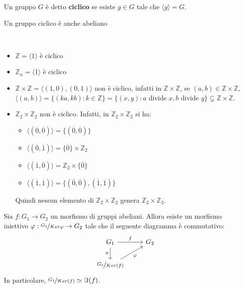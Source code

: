 \documentclass[../main.tex]{subfiles}
\begin{document}
\begin{definition}
    Un gruppo $G$ è detto \textbf{ciclico} se esiste $g \in G$ tale che $\langle g \rangle = G$.

    Un gruppo ciclico è anche abeliano
\end{definition}

\begin{example}
    \
    \begin{itemize}
        \item $\mathbb{Z} = \langle 1 \rangle$ è ciclico
        \item $\mathbb{Z}_n = \langle \overline{1} \rangle$ è ciclico
        \item $\mathbb{Z} \times \mathbb{Z} = \langle (1,0), (0,1) \rangle$ non è ciclico,
              infatti in $\mathbb{Z}  \times \mathbb{Z} $, se $(a,b) \in \mathbb{Z} \times \mathbb{Z} $,
              $\langle (a,b) \rangle = \{(ka,kb) : k \in \mathbb{Z} \} = \{(x,y) : a \text{ divide } x,b \text{ divide } y\}
                  \subsetneq \mathbb{Z} \times \mathbb{Z} $.
        \item $\mathbb{Z}_2 \times \mathbb{Z}_2$ non è ciclico. Infatti, in $\mathbb{Z}_2 \times \mathbb{Z}_2$ si ha:
              \
              \begin{itemize}
                  \item $\langle (\overline{0},\overline{0}) \rangle = \{(\overline{0},\overline{0})\}$
                  \item $\langle (\overline{0}, \overline{1}) \rangle = \{\overline{0}\} \times \mathbb{Z}_2$
                  \item  $\langle (\overline{1}, \overline{0}) \rangle = \mathbb{Z}_2 \times \{\overline{0}\}$
                  \item $\langle (\overline{1}, \overline{1}) \rangle = \{(\overline{0},\overline{0}),(\overline{1},\overline{1})\}$
              \end{itemize}
              Quindi nessun elemento di $\mathbb{Z}_2 \times \mathbb{Z}_2$ genera $\mathbb{Z}_2 \times \mathbb{Z}_2$.
    \end{itemize}
\end{example}

\begin{theorem}
    Sia $f: G_1 \rightarrow G_2$ un morfismo di gruppi abeliani. Allora esiste un morfismo iniettivo $\varphi : \nicefrac{G_1}{Ker \varphi} \rightarrow G_2$ tale che il seguente diagramma è commutativo:
    \begin{equation*}
        \begin{tikzcd}
            G_1 \arrow[r, "f"] \arrow[d, "\pi"'] & G_2 \\
            \nicefrac{G_1}{Ker(f)} \arrow[ru, "\varphi"']
        \end{tikzcd}
    \end{equation*}
    In particolare, $\nicefrac{G_1}{Ker(f)} \simeq \Im(f)$.
\end{theorem}
\end{document}
